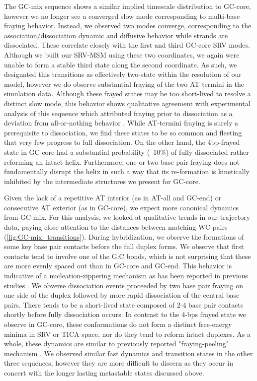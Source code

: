 \documentclass[journal=jpcbfk,manuscript=article]{achemso}
\begin{document}
The GC-mix sequence shows a similar implied timescale distribution to GC-core, however we no longer see a converged slow mode corresponding to multi-base fraying behavior. Instead, we observed two modes converge, corresponding to the association/dissociation dynamic and diffusive behavior while strands are dissociated. These correlate closely with the first and third GC-core SRV modes. Although we built our SRV-MSM using these two coordinates, we again were unable to form a stable third state along the second coordinate. As such, we designated this transitions as effectively two-state within the resolution of our model, however we do observe substantial fraying of the two AT termini in the simulation data. Although these frayed states may be too short-lived to resolve a distinct slow mode, this behavior shows qualitative agreement with experimental analysis of this sequence which attributed fraying prior to dissociation as a deviation from all-or-nothing behavior \citep{Sanstead2016}.  While AT-termini fraying is surely a prerequisite to dissociation, we find these states to be so common and fleeting that very few progress to full dissociation. On the other hand, the 4bp-frayed state in GC-core had a substantial probability (~10\%) of fully dissociated rather reforming an intact helix. Furthermore, one or two base pair fraying does not fundamentally disrupt the helix in such a way that its re-formation is kinetically inhibited by the intermediate structures we present for GC-core.  

Given the lack of a repetitive AT interior (as in AT-all and GC-end) or consecutive AT exterior (as in GC-core), we expect more canonical dynamics from GC-mix. For this analysis, we looked at qualitative trends in our trajectory data, paying close attention to the distances between matching WC-pairs (\ref{fig:GC-mix_transitions}). During hybridization, we observe the formations of some key base pair contacts before the full duplex forms. We observe that first contacts tend to involve one of the G:C bonds, which is not surprising that these are more evenly spaced out than in GC-core and GC-end. This behavior is indicative of a nucleation-zippering mechanism as has been reported in previous studies \citep{Yin2011KineticsHybridization, Porschke1971CooperativeTransition}. We obverse dissociation events proceeded by two base pair fraying on one side of the duplex followed by more rapid dissociation of the central base pairs. There tends to be a short-lived state composed of 2-4 base pair contacts shortly before fully dissociation occurs. In contrast to the 4-bps frayed state we observe in GC-core, these conformations do not form a distinct free-energy minima in SRV or TICA space, nor do they tend to reform intact duplexes. As a whole, these dynamics are similar to previously reported "fraying-peeling" mechanism \citep{Wong2008TheSimulations, Perez2010Real-timeUnfolding, Zgarbova2014BaseRNA}. We observed similar fast dynamics and transition states in the other three sequences, however they are more difficult to discern as they occur in concert with the longer lasting metastable states discussed above.
\end{document}
